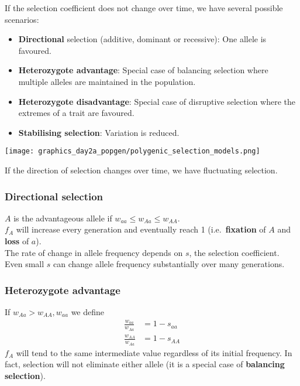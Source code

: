 \documentclass{beamer}
\newcommand{\1}{\ensuremath{\mathbf{1}}}
\begin{document}
%
%
%
\begin{frame}
	If the selection coefficient does not change over time, we have several possible scenarios:
	\begin{itemize}
		\item \textbf{Directional} selection (additive, dominant or recessive): One allele is favoured.
		\item \textbf{Heterozygote advantage}: Special case of balancing selection where multiple alleles are maintained in the population.
		\item \textbf{Heterozygote disadvantage}: Special case of disruptive selection where the extremes of a trait are favoured.
		\item \textbf{Stabilising selection}: Variation is reduced.
	\end{itemize}
	\begin{center}
		\texttt{[image: graphics\_day2a\_popgen/polygenic\_selection\_models.png]}
	\end{center}
	{\footnotesize If the direction of selection changes over time, we have fluctuating selection.}
\end{frame}
%
%
%
\begin{frame}\frametitle{Directional selection}
	$A$ is the advantageous allele if $w_{aa} \leq w_{Aa} \leq w_{AA}$.\\[2ex]
	$f_A$ will increase every generation and eventually reach 1 (i.e.\ \textbf{fixation} of $A$ and \textbf{loss} of $a$).\\[2ex]
	The rate of change in allele frequency depends on $s$, the selection coefficient.\\
	Even small $s$ can change allele frequency substantially over many generations.
\end{frame}
%
%
%
\begin{frame}\frametitle{Heterozygote advantage}
	If $w_{Aa} > w_{AA}, w_{aa}$ we define
	\begin{equation}
		\begin{split}
			\tfrac{w_{aa}}{w_{Aa}} & = 1 - s_{aa}\\
			\tfrac{w_{AA}}{w_{Aa}} & = 1 - s_{AA}
		\end{split}
	\end{equation}
	$f_A$ will tend to the same intermediate value regardless of its initial frequency. In fact, selection will not eliminate either allele (it is a special case of \textbf{balancing selection}).
\end{frame}
\end{document}
